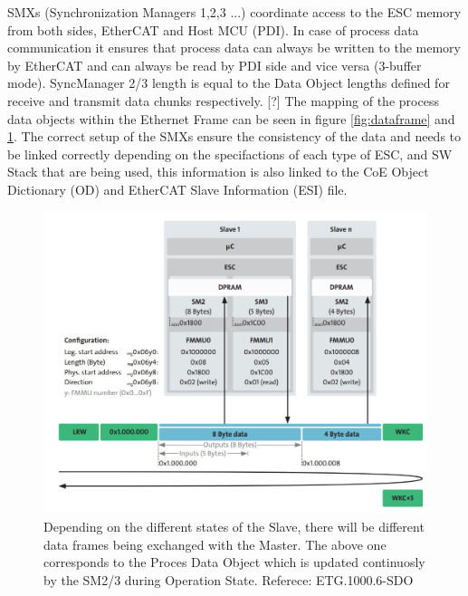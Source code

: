 SMXs (Synchronization Managers 1,2,3 ...) coordinate access to the ESC memory from both sides, EtherCAT and
Host MCU (PDI). In case of process data communication it ensures that process data can
always be written to the memory by EtherCAT and can always be read by PDI side and vice versa (3-buffer mode). SyncManager 2/3 length is equal
to the Data Object lengths defined for receive and transmit data chunks respectively. [?] %
The mapping of the process data objects within the Ethernet Frame can be seen in figure \ref{fig:dataframe} and \ref{fig:pdomapping}.
The correct setup of the SMXs ensure the consistency of the data and needs to be linked correctly depending on the specifactions of each type of ESC,
 and SW Stack that are being used, this information is also linked to the CoE Object Dictionary (OD) and EtherCAT Slave Information (ESI) file.
\begin{figure}[ht]
    \centering
    \includegraphics[width=.85\textwidth]{imgs/impl-dataframe_pdo.jpg}
    \caption{Depending on the different states of the Slave, there will be different data frames being exchanged with the Master. 
    The above one corresponds to the Proces Data Object which is updated continuosly by the SM2/3 during Operation State. Referece: 
    ETG.1000.6-SDO}
    \label{fig:pdomapping}
\end{figure}